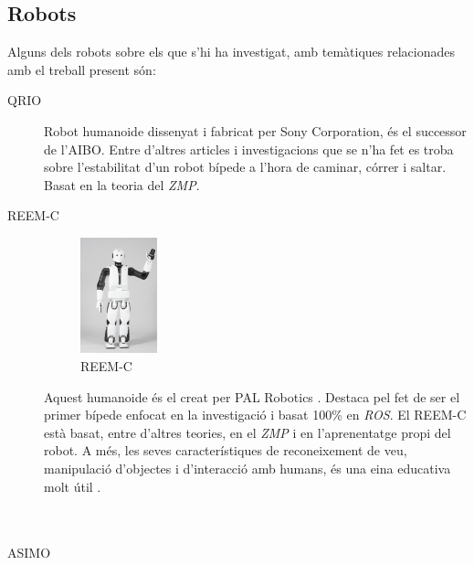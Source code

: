 \documentclass[12pt,a4paper,final,twoside]{report}
\begin{document}
\subsection{Robots}
\label{Robots}

Alguns dels robots sobre els que s'hi ha investigat, amb temàtiques relacionades amb el treball present són:
\begin{description}
\item[QRIO]
\begin{minipage}[t]{0.94\linewidth}
Robot humanoide dissenyat i fabricat per Sony Corporation, és el successor de l'AIBO. Entre d'altres articles i investigacions que se n'ha fet es troba \cite{Nagasaka2004} sobre l'estabilitat d'un robot bípede a l'hora de caminar, córrer i saltar. Basat en la teoria del \textit{ZMP}.
\end{minipage}

\item[REEM-C]
\begin{minipage}[t]{0.94\linewidth}
	\begin{figure}
	    \centering
		\includegraphics[width=0.22\textwidth]{Imatges/REEM-C.jpg}
                \caption{REEM-C \cite{REEM_C}}
     \end{figure}
Aquest humanoide és el creat per PAL Robotics \cite{REEM_C}. Destaca pel fet de ser el primer bípede enfocat en la investigació i basat 100\% en \textit{ROS}. El REEM-C està basat, entre d'altres teories, en el \textit{ZMP} i en l'aprenentatge propi del robot. A més, les seves característiques de reconeixement de veu, manipulació d'objectes i d'interacció amb humans, és una eina educativa molt útil \cite{REEM_C}.
\end{minipage}

\paragraph{}$ $%

\item[ASIMO]
\begin{minipage}[t]{0.94\linewidth}


\end{minipage}
\end{description}
\end{document}
